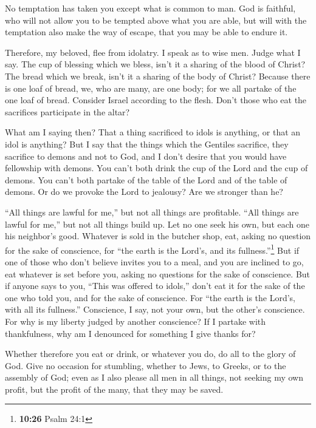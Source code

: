  No temptation has taken you except what is common to
man. God is faithful, who will not allow you to be tempted above what
you are able, but will with the temptation also make the way of escape,
that you may be able to endure it.

 Therefore, my beloved, flee from idolatry.
 I speak as to wise men. Judge what I say.
 The cup of blessing which we bless, isn't it a sharing
of the blood of Christ? The bread which we break, isn't it a sharing of
the body of Christ?  Because there is one loaf of bread,
we, who are many, are one body; for we all partake of the one loaf of
bread.  Consider Israel according to the flesh. Don't
those who eat the sacrifices participate in the altar?

 What am I saying then? That a thing sacrificed to idols
is anything, or that an idol is anything?  But I say that
the things which the Gentiles sacrifice, they sacrifice to demons and
not to God, and I don't desire that you would have fellowship with
demons.  You can't both drink the cup of the Lord and the
cup of demons. You can't both partake of the table of the Lord and of
the table of demons.  Or do we provoke the Lord to
jealousy? Are we stronger than he?

 ``All things are lawful for me,'' but not all things are
profitable. ``All things are lawful for me,'' but not all things build
up.  Let no one seek his own, but each one his neighbor's
good.  Whatever is sold in the butcher shop, eat, asking
no question for the sake of conscience,  for ``the earth
is the Lord's, and its fullness.''\footnote{\textbf{10:26} Psalm 24:1}
 But if one of those who don't believe invites you to a
meal, and you are inclined to go, eat whatever is set before you, asking
no questions for the sake of conscience.  But if anyone
says to you, ``This was offered to idols,'' don't eat it for the sake of
the one who told you, and for the sake of conscience. For ``the earth is
the Lord's, with all its fullness.''  Conscience, I say,
not your own, but the other's conscience. For why is my liberty judged
by another conscience?  If I partake with thankfulness,
why am I denounced for something I give thanks for?

 Whether therefore you eat or drink, or whatever you do,
do all to the glory of God.  Give no occasion for
stumbling, whether to Jews, to Greeks, or to the assembly of God;
 even as I also please all men in all things, not seeking
my own profit, but the profit of the many, that they may be saved.

